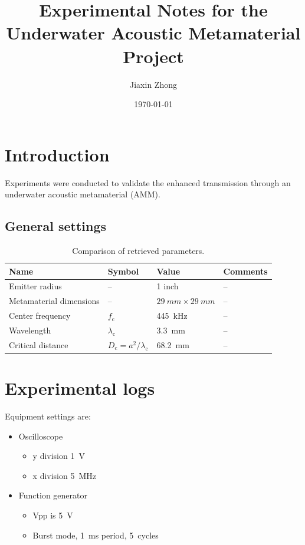 \documentclass{article}
\title{\textbf{Experimental Notes for the Underwater Acoustic Metamaterial Project}}
\author{Jiaxin Zhong}
\date{\today}
\begin{document}
\maketitle
\thispagestyle{firststyle}

\section{Introduction}
Experiments were conducted to validate the enhanced transmission through an underwater acoustic metamaterial (AMM).

\subsection{General settings}

\begin{table}[!htb]
    \centering
    \caption{Comparison of retrieved parameters.}
    \begin{tabular}{llll}
        \toprule
        Name & Symbol & Value & Comments 
         \\
        \midrule
        Emitter radius
             &  -- & 1 inch & -- 
             \\
             Metamaterial dimensions
             & --
             & $\SI{29}{mm} \times \SI{29}{mm}$
             & --
             \\
            Center frequency 
                 & $f_\mathrm{c}$
                 & 445~kHz & --
             \\
             Wavelength
                 & $\lambda_\mathrm{c}$
                 & 3.3~mm & --
            \\
             Critical distance
                 & $D_\mathrm{c} = a^2/\lambda_\mathrm{c}$
             & 68.2~mm
             & --
            \\
        \bottomrule
    \end{tabular}
    \label{tab:param}
\end{table}

\section{Experimental logs}
Equipment settings are:
\begin{itemize}
    \item Oscilloscope
        \begin{itemize}
            \item y division 1~V
            \item x division 5~MHz
        \end{itemize}
    \item Function generator
        \begin{itemize}
            \item Vpp is 5~V
            \item Burst mode, 1~ms period, 5~cycles
        \end{itemize}
\end{itemize}
\end{document}

